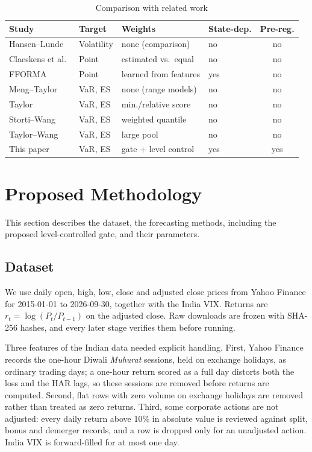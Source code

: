 \documentclass[conference]{IEEEtran}
\begin{document}
\begin{table}[t]
\centering
\caption{Comparison with related work}
\label{tab:rw}
\footnotesize
\setlength{\tabcolsep}{2.5pt}
\begin{tabular}{llllc}
\toprule
Study & Target & Weights & State-dep. & Pre-reg.\\
\midrule
Hansen--Lunde \cite{hansen2005} & Volatility & none (comparison) & no & no\\
Claeskens et al.\ \cite{claeskens2016} & Point & estimated vs.\ equal & no & no\\
FFORMA \cite{montero2020} & Point & learned from features & yes & no\\
Meng--Taylor \cite{meng2020} & VaR, ES & none (range models) & no & no\\
Taylor \cite{taylor2020} & VaR, ES & min./relative score & no & no\\
Storti--Wang \cite{storti2023} & VaR, ES & weighted quantile & no & no\\
Taylor--Wang \cite{taylorwang2025} & VaR, ES & large pool & no & no\\
This paper & VaR, ES & gate + level control & yes & yes\\
\bottomrule
\end{tabular}
\end{table}

\section{Proposed Methodology}

This section describes the dataset, the forecasting methods, including the proposed level-controlled gate, and their parameters.

\subsection{Dataset}
We use daily open, high, low, close and adjusted close prices from Yahoo Finance for 2015-01-01 to 2026-09-30, together with the India VIX. Returns are $r_t=\log(P_t/P_{t-1})$ on the adjusted close. Raw downloads are frozen with SHA-256 hashes, and every later stage verifies them before running.

Three features of the Indian data needed explicit handling. First, Yahoo Finance records the one-hour Diwali \emph{Muhurat} sessions, held on exchange holidays, as ordinary trading days; a one-hour return scored as a full day distorts both the loss and the HAR lags, so these sessions are removed before returns are computed. Second, flat rows with zero volume on exchange holidays are removed rather than treated as zero returns. Third, some corporate actions are not adjusted: every daily return above 10\% in absolute value is reviewed against split, bonus and demerger records, and a row is dropped only for an unadjusted action. India VIX is forward-filled for at most one day.
\end{document}
